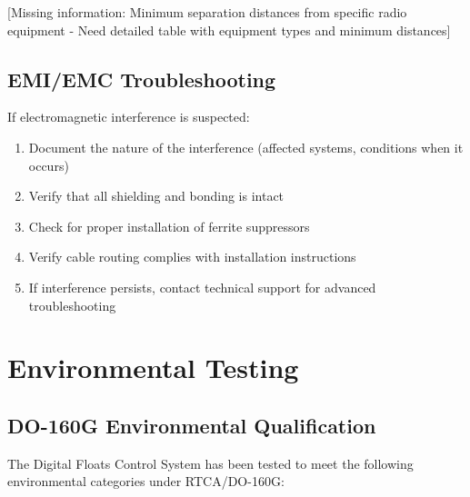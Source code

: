 \documentclass[12pt,a4paper,twoside,openright]{book}
\begin{document}
{\color{missingred}[Missing information: Minimum separation distances from specific radio equipment - Need detailed table with equipment types and minimum distances]}

\subsection{EMI/EMC Troubleshooting}

If electromagnetic interference is suspected:

\begin{enumerate}
    \item Document the nature of the interference (affected systems, conditions when it occurs)
    \item Verify that all shielding and bonding is intact
    \item Check for proper installation of ferrite suppressors
    \item Verify cable routing complies with installation instructions
    \item If interference persists, contact technical support for advanced troubleshooting
\end{enumerate}

\section{Environmental Testing}

\subsection{DO-160G Environmental Qualification}

The Digital Floats Control System has been tested to meet the following environmental categories under RTCA/DO-160G:
\end{document}
